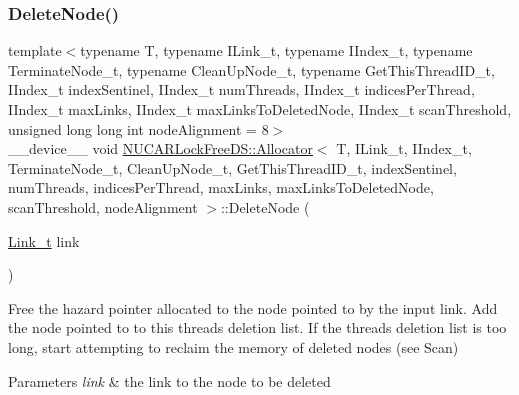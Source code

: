 \subsubsection{\texorpdfstring{Delete\+Node()}{DeleteNode()}}
{\footnotesize\ttfamily template$<$typename T, typename I\+Link\+\_\+t, typename I\+Index\+\_\+t, typename Terminate\+Node\+\_\+t, typename Clean\+Up\+Node\+\_\+t, typename Get\+This\+Thread\+I\+D\+\_\+t, I\+Index\+\_\+t index\+Sentinel, I\+Index\+\_\+t num\+Threads, I\+Index\+\_\+t indices\+Per\+Thread, I\+Index\+\_\+t max\+Links, I\+Index\+\_\+t max\+Links\+To\+Deleted\+Node, I\+Index\+\_\+t scan\+Threshold, unsigned long long int node\+Alignment = 8$>$ \\
\+\_\+\+\_\+device\+\_\+\+\_\+ void \mbox{\hyperlink{class_n_u_c_a_r_lock_free_d_s_1_1_allocator}{N\+U\+C\+A\+R\+Lock\+Free\+D\+S\+::\+Allocator}}$<$ T, I\+Link\+\_\+t, I\+Index\+\_\+t, Terminate\+Node\+\_\+t, Clean\+Up\+Node\+\_\+t, Get\+This\+Thread\+I\+D\+\_\+t, index\+Sentinel, num\+Threads, indices\+Per\+Thread, max\+Links, max\+Links\+To\+Deleted\+Node, scan\+Threshold, node\+Alignment $>$\+::Delete\+Node (\begin{DoxyParamCaption}\item[{\mbox{\hyperlink{class_n_u_c_a_r_lock_free_d_s_1_1_allocator_a5508d82b795e6c1977bebb67b5e5b686}{Link\+\_\+t}}}]{link }\end{DoxyParamCaption})\hspace{0.3cm}{\ttfamily [inline]}}

Free the hazard pointer allocated to the node pointed to by the input link. Add the node pointed to to this thread\textquotesingle{}s deletion list. If the thread\textquotesingle{}s deletion list is too long, start attempting to reclaim the memory of deleted nodes (see Scan) 
\begin{DoxyParams}{Parameters}
{\em link} & the link to the node to be deleted \\
\hline
\end{DoxyParams}
\mbox{\label{class_n_u_c_a_r_lock_free_d_s_1_1_allocator_a02c5eef54aaebcad88edb0e87d5b7557}} 
